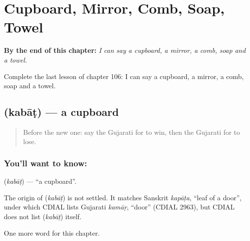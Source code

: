 
\chapter{Cupboard, Mirror, Comb, Soap, Towel}
\label{ch:gu-cupboard-mirror-comb-soap-towel}

\begin{chapteropening}
\textbf{By the end of this chapter:} \emph{I can say a cupboard, a mirror, a comb, soap and a towel.}

Complete the last lesson of chapter 106: I can say a cupboard, a mirror, a comb, soap and a towel.
\end{chapteropening}

\section[\texorpdfstring{\gu{કબાટ} (kabāṭ)}{કબાટ (kabāṭ)}]{ (kabāṭ) — a cupboard}

\label{lesson:GU-C106-kabat}



\begin{quote}
Before the new one: say the Gujarati for to win, then the Gujarati for to lose.
\end{quote}

\subsection*{You'll want to know: }
\textbf{} (\emph{kabāṭ}) — \textquotedblleft{}a cupboard\textquotedblright{}.

\begin{cousinweb}
The origin of \textbf{} (\emph{kabāṭ}) is not settled. It matches Sanskrit \emph{kapāṭa}, \textquotedblleft{}leaf of a door\textquotedblright{}, under which CDIAL lists Gujarati \emph{kamāṛ}, \textquotedblleft{}door\textquotedblright{} (CDIAL 2963), but CDIAL does not list \textbf{} (\emph{kabāṭ}) itself.
\end{cousinweb}

\begin{grammarlens}[title={What you've built}]
One more word for this chapter.
\end{grammarlens}

